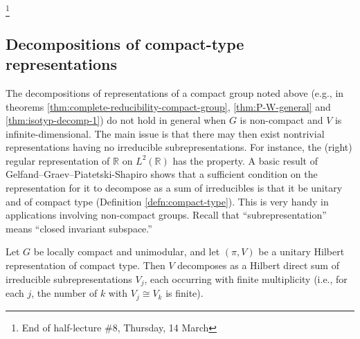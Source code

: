 \documentclass[reqno]{amsart} 
\begin{document}
\footnote{End of half-lecture \#8, Thursday, 14 March}

\subsection{Decompositions of compact-type representations}\label{sec:cnh2vot8yp}
The decompositions of representations of a compact group noted above (e.g., in theorems \ref{thm:complete-reducibility-compact-group}, \ref{thm:P-W-general} and \ref{thm:isotyp-decomp-1}) do not hold in general when $G$ is non-compact and $V$ is infinite-dimensional.  The main issue is that there may then exist nontrivial representations having no irreducible subrepresentations.  For instance, the (right) regular representation of $\mathbb{R}$ on $L^2(\mathbb{R})$ has the property.  A basic result of Gelfand--Graev--Piatetski-Shapiro shows that a sufficient condition on the representation for it to decompose as a sum of irreducibles is that it be unitary and of compact type (Definition \ref{defn:compact-type}).  This is very handy in applications involving non-compact groups.  Recall that ``subrepresentation'' means ``closed invariant subspace.''
\begin{theorem}
  Let $G$ be locally compact and unimodular, and let $(\pi,V)$ be a unitary Hilbert representation of compact type.  Then $V$ decomposes as a Hilbert direct sum of irreducible subrepresentations $V_j$, each occurring with finite multiplicity (i.e., for each $j$, the number of $k$ with $V_j \cong V_k$ is finite).
\end{theorem}
\end{document}
